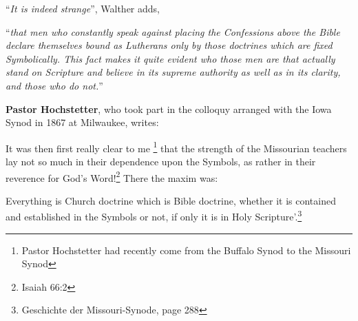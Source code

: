                 “\textit{It is indeed strange}”, Walther adds, \begin{displayquote}“\textit{that men who constantly speak against placing the Confessions above the Bible declare themselves bound as Lutherans only by those doctrines which are fixed Symbolically.  This fact makes it quite evident who those men are that actually stand on Scripture and believe in its supreme authority as well as in its clarity, and those who do not.}”\end{displayquote}\textbf{Pastor Hochstetter}, who took part in the colloquy arranged with the Iowa Synod in 1867 at Milwaukee, writes: \begin{fancyquotes}It was then first really clear to me \footnote{Pastor Hochstetter had recently come from the Buffalo Synod to the Missouri Synod} that the strength of the Missourian teachers lay not so much in their dependence upon the Symbols, as rather in their reverence for God’s Word!\footnote{Isaiah 66:2} There the maxim was: \begin{displayquote}{\footnotesize Everything is Church doctrine which is Bible doctrine, whether it is contained and established in the Symbols or not, if only it is in Holy Scripture}’.\footnote{Geschichte der Missouri-Synode, page 288}\end{displayquote}\end{fancyquotes}

